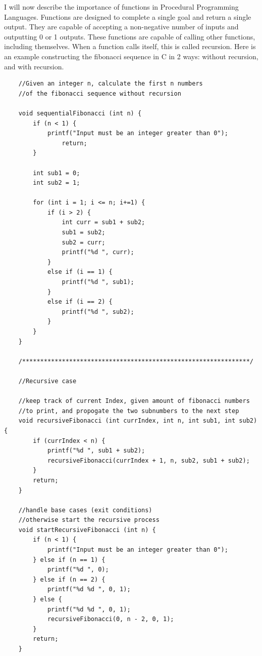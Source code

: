 I will now describe the importance of functions in Procedural Programming Languages.
Functions are designed to complete a single goal and return a single output.
They are capable of accepting a non-negative number of inputs and outputting 0 or 1 outputs.
These functions are capable of calling other functions, including themselves.
When a function calls itself, this is called recursion.
Here is an example constructing the fibonacci sequence in C in 2 ways: without recursion, and with recursion.

\begin{verbatim}
    //Given an integer n, calculate the first n numbers
    //of the fibonacci sequence without recursion
    
    void sequentialFibonacci (int n) {
        if (n < 1) {
            printf("Input must be an integer greater than 0");
                return;
        }

        int sub1 = 0;
        int sub2 = 1;

        for (int i = 1; i <= n; i+=1) {
            if (i > 2) {
                int curr = sub1 + sub2;
                sub1 = sub2;
                sub2 = curr;
                printf("%d ", curr);
            }
            else if (i == 1) {
                printf("%d ", sub1);
            }
            else if (i == 2) {
                printf("%d ", sub2);
            }
        }
    }

    /***************************************************************/

    //Recursive case

    //keep track of current Index, given amount of fibonacci numbers
    //to print, and propogate the two subnumbers to the next step
    void recursiveFibonacci (int currIndex, int n, int sub1, int sub2) {
        if (currIndex < n) {
            printf("%d ", sub1 + sub2);
            recursiveFibonacci(currIndex + 1, n, sub2, sub1 + sub2);
        }
        return;
    }

    //handle base cases (exit conditions)
    //otherwise start the recursive process
    void startRecursiveFibonacci (int n) {
        if (n < 1) {
            printf("Input must be an integer greater than 0");
        } else if (n == 1) {
            printf("%d ", 0);
        } else if (n == 2) {
            printf("%d %d ", 0, 1);
        } else {
            printf("%d %d ", 0, 1);
            recursiveFibonacci(0, n - 2, 0, 1);
        }
        return;
    }
\end{verbatim}

